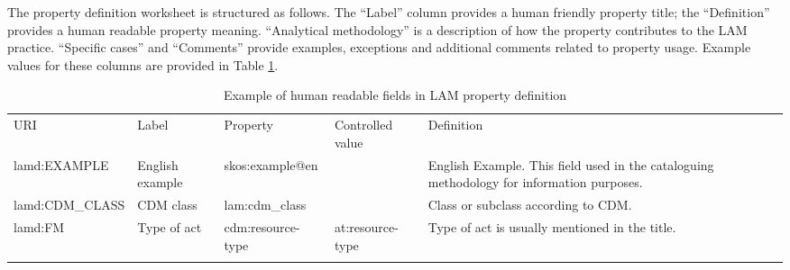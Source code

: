 The property definition worksheet is structured as follows. The ``Label'' column provides a human friendly property title; the ``Definition'' provides a human readable property meaning. ``Analytical methodology'' is
a description of how the property contributes to the LAM practice.
 ``Specific cases'' and ``Comments'' provide examples, exceptions and
additional comments related to property usage. Example values for these
columns are provided in Table \ref{tab:ex1}.

{
\fontsize{10pt}{10pt}
\selectfont%
\begin{longtable}[c]{@{}p{2.73cm}p{1.7cm}p{2.5cm}p{1.62cm}p{4.75cm}@{}}
	\toprule\addlinespace
	URI  & Label & Property & Controlled value & Definition
	\\\addlinespace
	\midrule\endhead
	lamd:EXAMPLE & English example & skos:example@en & &
	English Example. This field used in the cataloguing methodology for
	information purposes.
	\\\addlinespace
	lamd:CDM\_CLASS & CDM class & lam:cdm\_class & & Class
	or subclass according to CDM.
	\\\addlinespace
	lamd:FM & Type of act & cdm:resource-type & at:resource-type &
	Type of act is usually mentioned in the title.
	\\\addlinespace
	\bottomrule
	\addlinespace	
	\caption{Example of human readable fields in LAM property definition}
	\label{tab:ex1}
	\vspace{-10pt}
\end{longtable}
}





